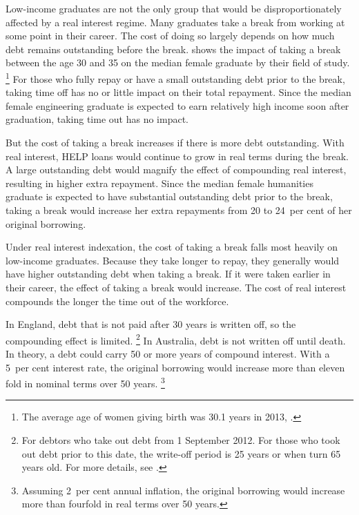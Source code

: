 \documentclass{grattan}
\begin{document}
Low-income graduates are not the only group that would be disproportionately affected by a real interest regime.
Many graduates take a break from working at some point in their career.
The cost of doing so largely depends on how much debt remains outstanding before the break.
 shows the impact of taking a break between the age 30 and 35 on the median female graduate by their field of study.%
   \footnote{The average age of women giving birth was 30.1 years in 2013, \textcite{AIHW2015Australiasmothersbabies}.} 
For those who fully repay or have a small outstanding debt prior to the break, taking time off has no or little impact on their total repayment.
Since the median female engineering graduate is expected to earn relatively high income soon after graduation, taking time out has no impact.

But the cost of taking a break increases if there is more debt outstanding.
With real interest, \gls{HELP} loans would continue to grow in real terms during the break.
A large outstanding debt would magnify the effect of compounding real interest, resulting in higher extra repayment.
Since the median female humanities graduate is expected to have substantial outstanding debt prior to the break, taking a break would increase her extra repayments from 20 to 24~per cent of her original borrowing.

Under real interest indexation, the cost of taking a break falls most heavily on low-income graduates.
Because they take longer to repay, they generally would have higher outstanding debt when taking a break.
If it were taken earlier in their career, the effect of taking a break would increase.
The cost of real interest compounds the longer the time out of the workforce.

In England, debt that is not paid after 30 years is written off, so the compounding effect is limited.%
   \footnote{For debtors who take out debt from 1 September 2012.
For those who took out debt prior to this date, the write-off period is 25 years or when turn 65 years old.
For more details, see \textcite{Company2016LoanCancellation}.} 
In Australia, debt is not written off until death.
In theory, a debt could carry 50 or more years of compound interest.
With a 5~per cent interest rate, the original borrowing would increase more than eleven fold in nominal terms over 50 years.%
   \footnote{Assuming 2~per cent annual inflation, the original borrowing would increase more than fourfold in real terms over 50 years.}
\end{document}
